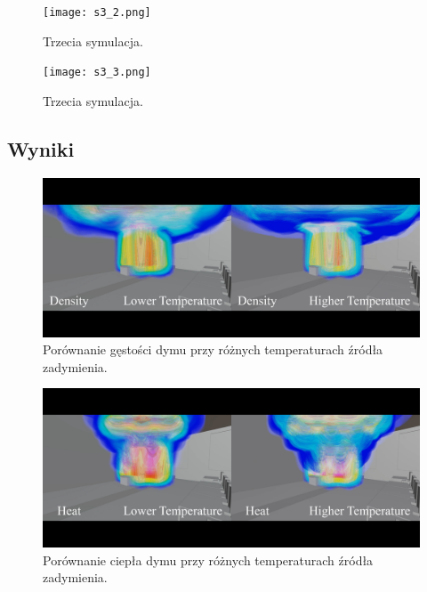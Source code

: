 \documentclass{article}
\begin{document}
        \begin{figure}[ht!]
            \centering
            \texttt{[image: s3\_2.png]}
            \caption{Trzecia symulacja.}
        \end{figure}
        
        \begin{figure}[ht!]
            \centering
            \texttt{[image: s3\_3.png]}
            \caption{Trzecia symulacja.}
        \end{figure}
       
       \newpage
        \subsection{Wyniki}
        
        \begin{figure}[ht!]
            \centering
            \includegraphics[scale = 0.15]{1.png}
            \caption{Porównanie gęstości dymu przy różnych temperaturach źródła zadymienia.}
        \end{figure}
        
        \begin{figure}[ht!]
            \centering
            \includegraphics[scale = 0.15]{2.png}
            \caption{Porównanie ciepła dymu przy różnych temperaturach źródła zadymienia.}
        \end{figure}
        
\end{document}
